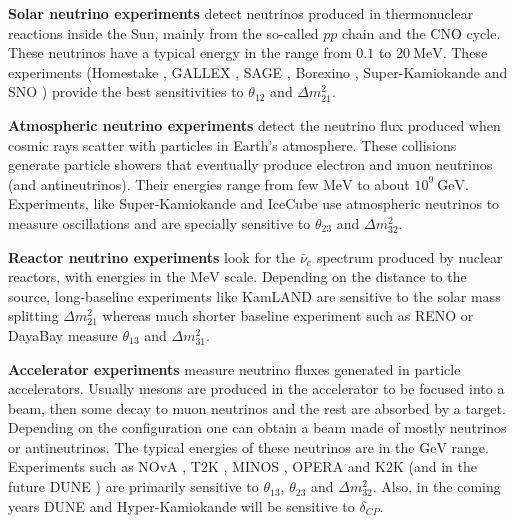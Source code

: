 \textbf{Solar neutrino experiments} detect neutrinos produced in thermonuclear reactions inside the Sun, mainly from the so-called $pp$ chain and the CNO cycle. These neutrinos have a typical energy in the range from $0.1$ to $20 \ \mathrm{MeV}$. These experiments (Homestake \cite{Homestake1998}, GALLEX \cite{GALLEX2010}, SAGE \cite{SAGE2009}, Borexino \cite{Borexino2011}, Super-Kamiokande \cite{Super-Kamiokande2005} and SNO \cite{SNO2011}) provide the best sensitivities to $\theta_{12}$ and $\Delta m^{2}_{21}$.

\textbf{Atmospheric neutrino experiments} detect the neutrino flux produced when cosmic rays scatter with particles in Earth's atmosphere. These collisions generate particle showers that eventually produce electron and muon neutrinos (and antineutrinos). Their energies range from few $\mathrm{MeV}$ to about $10^{9} \ \mathrm{GeV}$. Experiments, like Super-Kamiokande \cite{Super-Kamiokande2017} and IceCube \cite{IceCube2017} use atmospheric neutrinos to measure oscillations and are specially sensitive to $\theta_{23}$ and $\Delta m^{2}_{32}$.

\textbf{Reactor neutrino experiments} look for the $\bar{\nu}_{e}$ spectrum produced by nuclear reactors, with energies in the $\mathrm{MeV}$ scale. Depending on the distance to the source, long-baseline experiments like KamLAND \cite{KamLAND2013} are sensitive to the solar mass splitting $\Delta m^{2}_{21}$ whereas much shorter baseline experiment such as RENO \cite{RENO2018} or DayaBay \cite{DayaBay2018} measure $\theta_{13}$ and $\Delta m^{2}_{31}$.

\textbf{Accelerator experiments} measure neutrino fluxes generated in particle accelerators. Usually mesons are produced in the accelerator to be focused into a beam, then some decay to muon neutrinos and the rest are absorbed by a target. Depending on the configuration one can obtain a beam made of mostly neutrinos or antineutrinos. The typical energies of these neutrinos are in the $\mathrm{GeV}$ range. Experiments such as NOvA \cite{Nova2020}, T2K \cite{T2K2020}, MINOS \cite{MINOS2014}, OPERA \cite{OPERA2018} and K2K \cite{K2K2006} (and in the future DUNE \cite{DUNE2020}) are primarily sensitive to $\theta_{13}$, $\theta_{23}$ and $\Delta m^{2}_{32}$. Also, in the coming years  DUNE \cite{DUNE2020} and Hyper-Kamiokande \cite{Hyper-Kamiokande2019} will be sensitive to $\delta_{CP}$.

